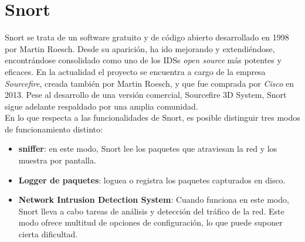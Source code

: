 
\section{Snort}
Snort se trata de un software gratuito y de código abierto desarrollado en 1998 por Martin Roesch. Desde su aparición, ha ido mejorando y extendiéndose, encontrándose consolidado como uno de los IDSs \textit{open source} más potentes y eficaces. En la actualidad el proyecto se encuentra a cargo de la empresa \textit{Sourcefire}, creada también por Martin Roesch, y que fue comprada por \textit{Cisco} en 2013. Pese al desarrollo de una versión comercial, Sourcefire 3D System, Snort sigue adelante respaldado por una amplia comunidad.\\
En lo que respecta a las funcionalidades de Snort, es posible distinguir tres modos de funcionamiento distinto:
\begin{itemize}
	\item \textbf{sniffer}: en este modo, Snort lee los paquetes que atraviesan la red y los muestra por pantalla.
	\item \textbf{Logger de paquetes}: loguea o registra los paquetes capturados en disco.
	\item \textbf{Network Intrusion Detection System}: Cuando funciona en este modo, Snort lleva a cabo tareas de análisis y detección del tráfico de la red. Este modo ofrece multitud de opciones de configuración, lo que puede suponer cierta dificultad. 
\end{itemize}
\cite{Syngress}


